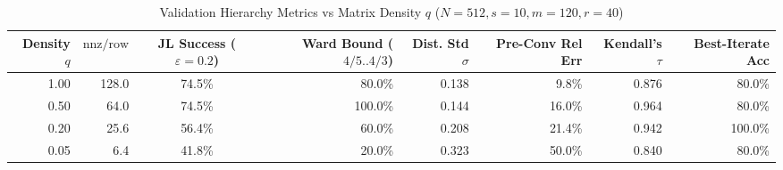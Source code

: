 \begin{table}[htbp]
\centering
\small
\caption{Validation Hierarchy Metrics vs Matrix Density $q$ ($N=512, s=10, m=120, r=40$)}
\label{tab:three_notions}
\begin{tabular}{rrcrrrrr}
\toprule
Density $q$ & $\mathrm{nnz}/\mathrm{row}$ & JL Success ($\varepsilon=0.2$) & Ward Bound ($4/5..4/3$) & Dist. Std $\sigma$ & Pre-Conv Rel Err & Kendall's $\tau$ & Best-Iterate Acc \\
\midrule
 1.00 & 128.0 &  74.5\% &  80.0\% & 0.138 &   9.8\% & 0.876 &  80.0\% \\
 0.50 &  64.0 &  74.5\% & 100.0\% & 0.144 &  16.0\% & 0.964 &  80.0\% \\
 0.20 &  25.6 &  56.4\% &  60.0\% & 0.208 &  21.4\% & 0.942 & 100.0\% \\
 0.05 &   6.4 &  41.8\% &  20.0\% & 0.323 &  50.0\% & 0.840 &  80.0\% \\
\bottomrule
\end{tabular}
\end{table}
